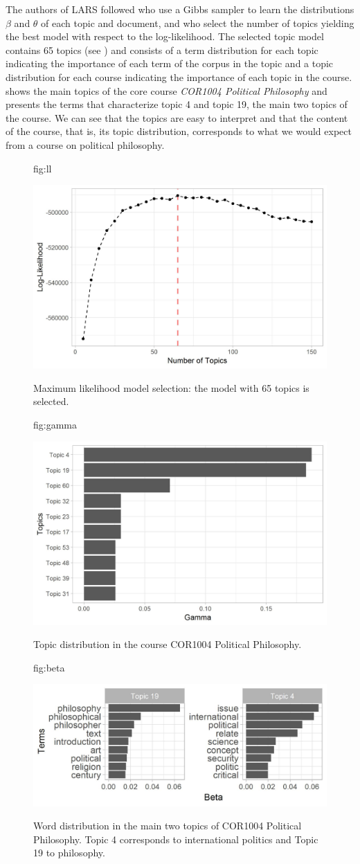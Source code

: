 \documentclass[pmlr]{jmlr}%
\begin{document}
The authors of LARS followed \citet{Phan.2008} who use a Gibbs sampler to learn the distributions $\beta$ and $\theta$ of each topic and document, and \citet{Griffiths.2004} who select the number of topics yielding the best model with respect to the log-likelihood. The selected topic model contains 65 topics (see ) and consists of a term distribution for each topic indicating the importance of each term of the corpus in the topic and a topic distribution for each course indicating the importance of each topic in the course.  shows the main topics of the core course \textit{COR1004 Political Philosophy} and  presents the terms that characterize topic 4 and topic 19, the main two topics of the course. We can see that the topics are easy to interpret and that the content of the course, that is, its topic distribution, corresponds to what we would expect from a course on political philosophy.

\begin{figure}[htbp]
	\floatconts
	{fig:ll}
	{\caption{Maximum likelihood model selection: the model with 65 topics is selected.}}
	{\includegraphics[width=0.5\linewidth]{figures/model-selection}}
\end{figure}

\begin{figure}[htbp]
	\floatconts
	{fig:gamma}
	{\caption{Topic distribution in the course COR1004 Political Philosophy.}}
	{\includegraphics[width=0.5\linewidth]{figures/gamma-COR1004}}
\end{figure}

\begin{figure}[htbp]
	\floatconts
	{fig:beta}
	{\caption{Word distribution in the main two topics of COR1004 Political Philosophy. Topic 4 corresponds to international politics and Topic 19 to philosophy.}}
	{\includegraphics[width=0.75\linewidth]{figures/beta}}
\end{figure}
\end{document}
